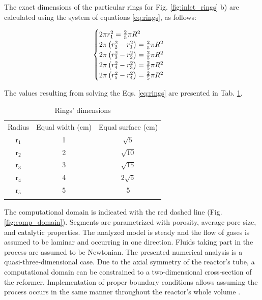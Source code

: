 \documentclass[preprint,12pt]{elsarticle}
\begin{document}
The exact dimensions of the particular rings for Fig. \ref{fig:inlet_rings} b) are calculated using the system of equations \eqref{eq:rings}, as follows:

\begin{equation}
\centering
\label{eq:rings}
\begin{cases}
	2\pi r_1^2 = \frac{2}{5}\pi R^2 \\
	2\pi \left(r_2^2 - r_1^2 \right) = \frac{2}{5}\pi R^2 \\
	2\pi \left(r_3^2 - r_2^2 \right) = \frac{2}{5}\pi R^2 \\
	2\pi \left(r_4^2 - r_3^2 \right) = \frac{2}{5}\pi R^2 \\
	2\pi \left(r_5^2 - r_4^2 \right) = \frac{2}{5}\pi R^2	
\end{cases}
\end{equation}

\vspace{3mm}

The values resulting from solving the Eqs. \eqref{eq:rings} are presented in Tab. \ref{tab:rings_radius}.  


\begin{table}[h]
\centering
\caption{Rings' dimensions}
\label{tab:rings_radius}
\begin{tabular}{c||c|c}
\hline\noalign{\smallskip}
Radius & Equal width (cm) & Equal surface (cm) \\
\noalign{\smallskip}\hline\noalign{\smallskip}
r$_1$ & 1 & $\sqrt{5}$ \\
\noalign{\smallskip}\hline\noalign{\smallskip}
r$_2$ & 2 & $\sqrt{10}$  \\
\noalign{\smallskip}\hline\noalign{\smallskip}
r$_3$ & 3 & $\sqrt{15}$  \\
\noalign{\smallskip}\hline\noalign{\smallskip}
r$_4$ & 4 & $2\sqrt{5}$ \\
\noalign{\smallskip}\hline\noalign{\smallskip}
r$_5$ & 5 & 5 \\
\noalign{\smallskip}\hline
\end{tabular}

\end{table}

The computational domain is indicated with the red dashed line (Fig. \ref{fig:comp_domain}). Segments are parametrized with porosity, average pore size, and catalytic properties. The analyzed model is steady and the flow of gases is assumed to be laminar and occurring in one direction. Fluids taking part in the process are assumed to be Newtonian. The presented numerical analysis is a quasi-three-dimensional case. Due to the axial symmetry of the reactor's tube, a computational domain can be constrained to a two-dimensional cross-section of the reformer. Implementation of proper boundary conditions allows assuming the process occurs in the same manner throughout the reactor's whole volume \cite{Patankar1980}. 
\end{document}
